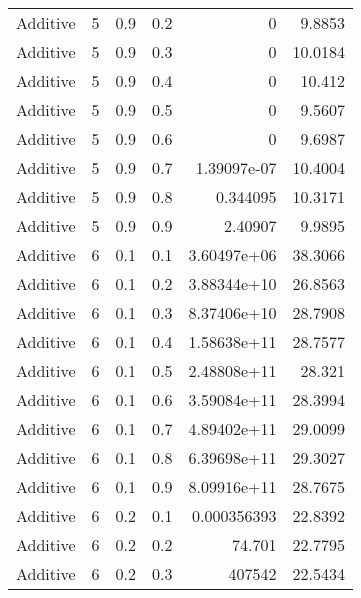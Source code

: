 \documentclass{article}
\begin{document}
\begin{longtable}[H]{lrrrrr}
 Additive       &       5 &   0.9 &            0.2 &      0           &          9.8853 \\
 Additive       &       5 &   0.9 &            0.3 &      0           &         10.0184 \\
 Additive       &       5 &   0.9 &            0.4 &      0           &         10.412  \\
 Additive       &       5 &   0.9 &            0.5 &      0           &          9.5607 \\
 Additive       &       5 &   0.9 &            0.6 &      0           &          9.6987 \\
 Additive       &       5 &   0.9 &            0.7 &      1.39097e-07 &         10.4004 \\
 Additive       &       5 &   0.9 &            0.8 &      0.344095    &         10.3171 \\
 Additive       &       5 &   0.9 &            0.9 &      2.40907     &          9.9895 \\
 Additive       &       6 &   0.1 &            0.1 &      3.60497e+06 &         38.3066 \\
 Additive       &       6 &   0.1 &            0.2 &      3.88344e+10 &         26.8563 \\
 Additive       &       6 &   0.1 &            0.3 &      8.37406e+10 &         28.7908 \\
 Additive       &       6 &   0.1 &            0.4 &      1.58638e+11 &         28.7577 \\
 Additive       &       6 &   0.1 &            0.5 &      2.48808e+11 &         28.321  \\
 Additive       &       6 &   0.1 &            0.6 &      3.59084e+11 &         28.3994 \\
 Additive       &       6 &   0.1 &            0.7 &      4.89402e+11 &         29.0099 \\
 Additive       &       6 &   0.1 &            0.8 &      6.39698e+11 &         29.3027 \\
 Additive       &       6 &   0.1 &            0.9 &      8.09916e+11 &         28.7675 \\
 Additive       &       6 &   0.2 &            0.1 &      0.000356393 &         22.8392 \\
 Additive       &       6 &   0.2 &            0.2 &     74.701       &         22.7795 \\
 Additive       &       6 &   0.2 &            0.3 & 407542           &         22.5434 \\

\end{longtable}
\end{document}

